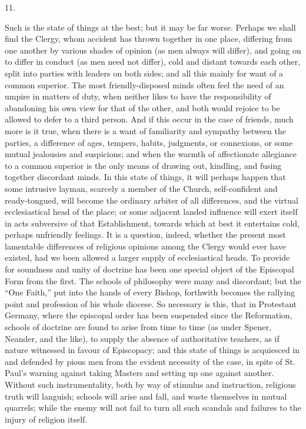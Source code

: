 11.

Such is the state of things at the best; but it
may be far worse. Perhaps we shall find the Clergy, whom accident has
thrown together in one place, differing from one another by various
shades of opinion (as men always will differ), and going on to differ
in conduct (as men need not differ), cold and distant towards each
other, split into parties with leaders on both sides; and all this
mainly for want of a common superior. The most friendly-disposed minds
often feel the need of an umpire in matters of duty, when neither
likes to have the responsibility of abandoning his own view for that
of the other, and both would rejoice to be allowed to defer to a third
person. And if this occur in the case of friends, much more is it
true, when there is a want of familiarity and sympathy between the
parties, a difference of ages, tempers, habits, judgments, or
connexions, or some mutual jealousies and suspicions; and when the
warmth of affectionate allegiance to a common superior is the only
means of drawing out, kindling, and fusing together discordant minds.
In this state of things, it will perhaps happen that some intrusive
layman, scarcely a member of the Church, self-confident and
ready-tongued, will become the ordinary arbiter of all differences,
and the virtual ecclesiastical head of the place; or some adjacent
landed influence will exert itself in acts subversive of that
Establishment, towards which at best it entertains cold, perhaps
unfriendly feelings. It is a question, indeed, whether the present
most lamentable differences of religious opinions among the Clergy
would ever have existed, had we been allowed a larger supply of
ecclesiastical heads. To provide for soundness and unity of doctrine
has been one special object of the Episcopal Form from the first.
The schools of philosophy were many and discordant; but the ``One
Faith,'' put into the hands of every Bishop, forthwith becomes the
rallying point and profession of his whole diocese. So necessary is
this, that in Protestant Germany, where the episcopal order has been
suspended since the Reformation, schools of doctrine are found to
arise from time to time (as under Spener, Neander, and the like), to
supply the absence of authoritative teachers, as if nature witnessed
in favour of Episcopacy; and this state of things is acquiesced in and
defended by pious men from the evident necessity of the case, in spite
of St. Paul's warning against taking Masters and setting up one
against another. Without such instrumentality, both by way of stimulus
and instruction, religious truth will languish; schools will arise and
fall, and waste themselves in mutual quarrels; while the enemy will
not fail to turn all such scandals and failures to the injury of
religion itself.

